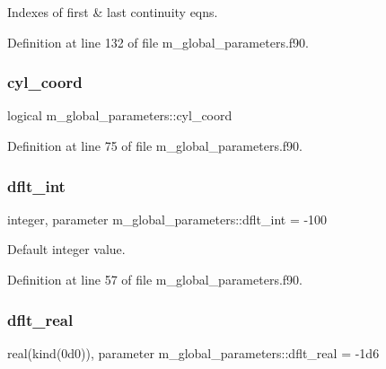 Indexes of first \& last continuity eqns. 



Definition at line 132 of file m\+\_\+global\+\_\+parameters.\+f90.

\mbox{\label{namespacem__global__parameters_a53f0d5eed7783c9760aaeeaa0abbd58c}} 
\subsubsection{\texorpdfstring{cyl\+\_\+coord}{cyl\_coord}}
{\footnotesize\ttfamily logical m\+\_\+global\+\_\+parameters\+::cyl\+\_\+coord}



Definition at line 75 of file m\+\_\+global\+\_\+parameters.\+f90.

\mbox{\label{namespacem__global__parameters_a4e4e3806190a62a77cf6542f6d07dbbd}} 
\subsubsection{\texorpdfstring{dflt\+\_\+int}{dflt\_int}}
{\footnotesize\ttfamily integer, parameter m\+\_\+global\+\_\+parameters\+::dflt\+\_\+int = -\/100}



Default integer value. 



Definition at line 57 of file m\+\_\+global\+\_\+parameters.\+f90.

\mbox{\label{namespacem__global__parameters_a99ba7e33a1870ac89386d376e0d20526}} 
\subsubsection{\texorpdfstring{dflt\+\_\+real}{dflt\_real}}
{\footnotesize\ttfamily real(kind(0d0)), parameter m\+\_\+global\+\_\+parameters\+::dflt\+\_\+real = -\/1d6}



